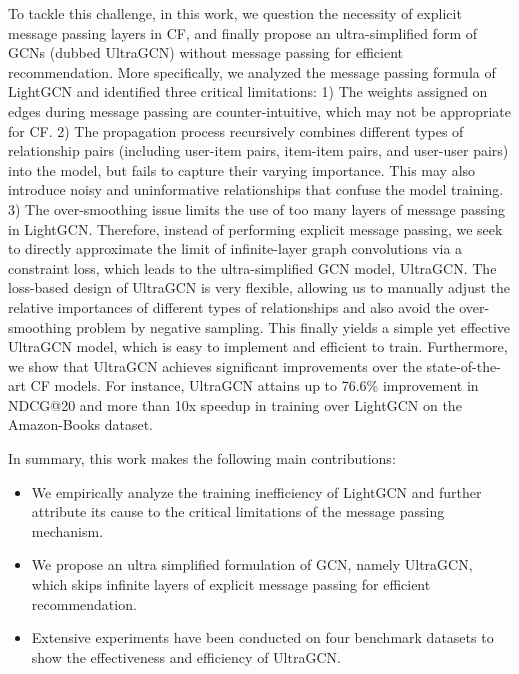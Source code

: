 \documentclass[sigconf,authorversion]{acmart}
\begin{document}
To tackle this challenge, in this work, we question the necessity of explicit message passing layers in CF, and finally propose an ultra-simplified form of GCNs (dubbed UltraGCN) without message passing for efficient recommendation. More specifically, we analyzed the message passing formula of LightGCN and identified three critical limitations: 1) The weights assigned on edges during message passing are counter-intuitive, which may not be appropriate for CF. 2) The propagation process recursively combines different types of relationship pairs (including user-item pairs, item-item pairs, and user-user pairs) into the model, but fails to capture their varying importance. This may also introduce noisy and uninformative relationships that  confuse the model training. 
3) The over-smoothing issue limits the use of too many layers of message passing in LightGCN. Therefore, instead of performing explicit message passing, we seek to directly approximate the limit of infinite-layer graph convolutions via a constraint loss, which leads to the ultra-simplified GCN model, UltraGCN. The loss-based design of UltraGCN is very flexible, allowing us to manually adjust the relative importances of different types of relationships and also avoid the over-smoothing problem by negative sampling. This finally yields a simple yet effective UltraGCN model, which is easy to implement and efficient to train. Furthermore, we show that UltraGCN achieves significant improvements over the state-of-the-art CF models. For instance, UltraGCN attains up to 76.6\% improvement in NDCG@20 and more than 10x speedup in training over LightGCN on the Amazon-Books dataset.

 






In summary, this work makes the following main contributions:
\begin{itemize}
	\item We empirically analyze the training inefficiency of LightGCN and further attribute its cause to the critical limitations of the message passing mechanism. 
    \item We propose an ultra simplified formulation of GCN, namely UltraGCN, which skips infinite layers of explicit message passing for efficient recommendation.
    \item Extensive experiments have been conducted on four benchmark datasets to show the effectiveness and efficiency of UltraGCN. 
\end{itemize}
\end{document}
